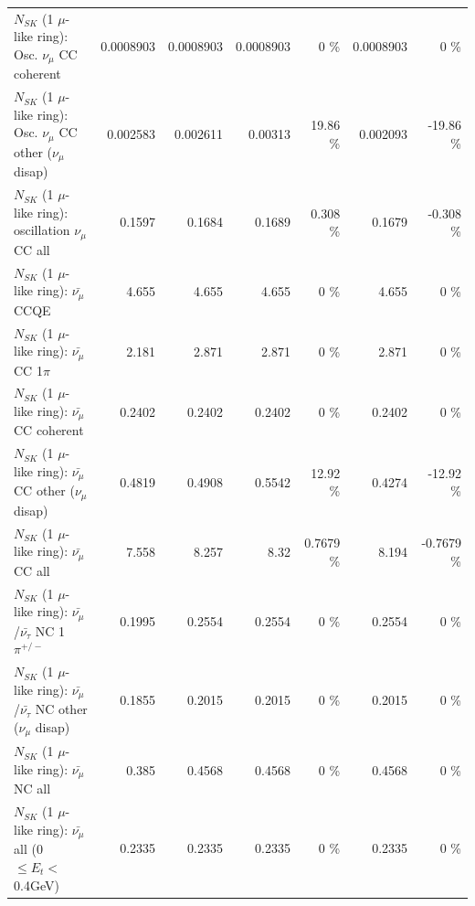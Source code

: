 \begin{table}
\begin{tabular}{| l | r | r | r  r | r  r |}
                        $N_{SK}$ (1 $\mu$-like ring): Osc. $\nu_\mu$ CC coherent &       0.0008903 &       0.0008903 &       0.0008903 &        0 \%  &       0.0008903 &        0 \%  \\ 
         $N_{SK}$ (1 $\mu$-like ring): Osc. $\nu_\mu$ CC other ($\nu_\mu$ disap) &        0.002583 &        0.002611 &         0.00313 &    19.86 \%  &        0.002093 &   -19.86 \%  \\ 
                      $N_{SK}$ (1 $\mu$-like ring): oscillation $\nu_\mu$ CC all &          0.1597 &          0.1684 &          0.1689 &    0.308 \%  &          0.1679 &   -0.308 \%  \\ 
\hline
\hline
                              $N_{SK}$ (1 $\mu$-like ring): $\bar{\nu_\mu}$ CCQE &           4.655 &           4.655 &           4.655 &        0 \%  &           4.655 &        0 \%  \\ 
                         $N_{SK}$ (1 $\mu$-like ring): $\bar{\nu_\mu}$ CC 1$\pi$ &           2.181 &           2.871 &           2.871 &        0 \%  &           2.871 &        0 \%  \\ 
                       $N_{SK}$ (1 $\mu$-like ring): $\bar{\nu_\mu}$ CC coherent &          0.2402 &          0.2402 &          0.2402 &        0 \%  &          0.2402 &        0 \%  \\ 
        $N_{SK}$ (1 $\mu$-like ring): $\bar{\nu_\mu}$ CC other ($\nu_\mu$ disap) &          0.4819 &          0.4908 &          0.5542 &    12.92 \%  &          0.4274 &   -12.92 \%  \\ 
                          $N_{SK}$ (1 $\mu$-like ring): $\bar{\nu_{\mu}}$ CC all &           7.558 &           8.257 &            8.32 &   0.7679 \%  &           8.194 &  -0.7679 \%  \\ 
\hline
  $N_{SK}$ (1 $\mu$-like ring): $\bar{\nu_\mu}$/$\bar{\nu_\tau}$ NC 1$\pi^{+/-}$ &          0.1995 &          0.2554 &          0.2554 &        0 \%  &          0.2554 &        0 \%  \\ 
$N_{SK}$ (1 $\mu$-like ring): $\bar{\nu_\mu}$/$\bar{\nu_\tau}$ NC other ($\nu_\mu$ disap) &          0.1855 &          0.2015 &          0.2015 &        0 \%  &          0.2015 &        0 \%  \\ 
                          $N_{SK}$ (1 $\mu$-like ring): $\bar{\nu_{\mu}}$ NC all &           0.385 &          0.4568 &          0.4568 &        0 \%  &          0.4568 &        0 \%  \\ 
\hline
   $N_{SK}$ (1 $\mu$-like ring): $\bar{\nu_{\mu}}$ all (0 $\leq E_{t} <$ 0.4GeV) &          0.2335 &          0.2335 &          0.2335 &        0 \%  &          0.2335 &        0 \%  \\ 

\end{tabular}
\end{table}
